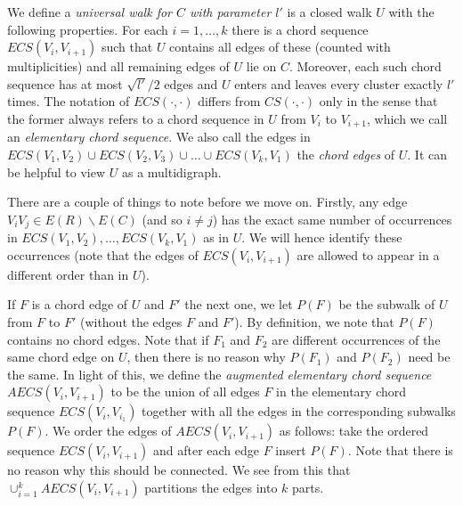 \documentclass[10pt,letterpaper, reqno]{amsart}
\theoremstyle{definition}
\numberwithin{equation}{section}
\begin{document}
We define a \textit{universal walk for $C$ with parameter $l'$} is a closed walk $U$ with the following properties. For each $i=1,\dots,k$ there is a chord sequence $ECS(V_i,V_{i+1})$ such that $U$ contains all edges of these (counted with multiplicities) and all remaining edges of $U$ lie on $C$. Moreover, each such chord sequence has at most $\sqrt{l'}/2$ edges and $U$ enters and leaves every cluster exactly $l'$ times. The notation of $ECS(\cdot, \cdot)$ differs from $CS(\cdot, \cdot)$ only in the sense that the former always refers to a chord sequence in $U$ from $V_{i}$ to $V_{i+1}$, which we call an \textit{elementary chord sequence}. We also call the edges in $ECS(V_1,V_2)\cup ECS(V_2,V_3) \cup \dots \cup ECS(V_k,V_1)$ the \textit{chord edges} of $U$. It can be helpful to view $U$ as a multidigraph.

There are a couple of things to note before we move on. Firstly, any edge $V_iV_j \in E(R)\backslash E(C)$ (and so $i \neq j$) has the exact same number of occurrences in $ECS(V_1,V_2),\dots, ECS(V_k,V_1)$ as in $U$. We will hence identify these occurrences (note that the edges of $ECS(V_i,V_{i+1})$ are allowed to appear in a different order than in $U$). 

If $F$ is a chord edge of $U$ and $F'$ the next one, we let $P(F)$ be the subwalk of $U$ from $F$ to $F'$ (without the edges $F$ and $F'$). By definition, we note that $P(F)$ contains no chord edges. Note that if $F_1$ and $F_2$ are different occurrences of the same chord edge on $U$, then there is no reason why $P(F_1)$ and $P(F_2)$ need be the same. In light of this, we define the \textit{augmented elementary chord sequence $AECS(V_i,V_{i+1})$} to be the union of all edges $F$ in the elementary chord sequence $ECS(V_i,V_{i_1})$ together with all the edges in the corresponding subwalks $P(F)$. We order the edges of $AECS(V_i,V_{i+1})$ as follows: take the ordered sequence $ECS(V_i,V_{i+1})$ and after each edge $F$ insert $P(F)$. Note that there is no reason why this should be connected. We see from this that $\cup_{i=1}^k AECS(V_i,V_{i+1})$ partitions the edges into $k$ parts. 
\end{document}
